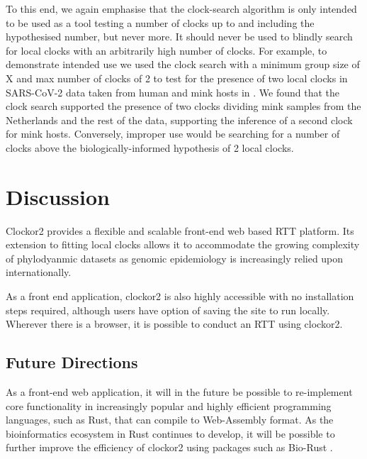\documentclass{article}
\begin{document}
To this end, we again emphasise that the clock-search algorithm is only intended to be used as a tool testing a number of clocks up to and including the hypothesised number, but never more. It should never be used to blindly search for local clocks with an arbitrarily high number of clocks. For example, to demonstrate intended use we used the clock search with a minimum group size of X and max number of clocks of 2 to test for the presence of two local clocks in SARS-CoV-2 data taken from human and mink hosts in \citet{porter2023evolutionary}. We found that the clock search supported the presence of two clocks dividing mink samples from the Netherlands and the rest of the data, supporting the inference of a second clock for mink hosts. Conversely, improper use would be searching for a number of clocks above the biologically-informed hypothesis of 2 local clocks.

\section*{Discussion}
Clockor2 provides a flexible and scalable front-end web based RTT platform. Its extension to fitting local clocks allows it to accommodate the growing complexity of phylodyanmic datasets as genomic epidemiology is increasingly relied upon internationally. 

As a front end application, clockor2 is also highly accessible with no installation steps required, although users have option of saving the site to run locally. Wherever there is a browser, it is possible to conduct an RTT using clockor2. 

\subsection*{Future Directions}
As a front-end web application, it will in the future be possible to re-implement core functionality in increasingly popular and highly efficient programming languages, such as Rust, that can compile to Web-Assembly format. As the bioinformatics ecosystem in Rust continues to develop, it will be possible to further improve the efficiency of clockor2 using packages such as Bio-Rust \citep{koester_rust-bio-2015}.

\end{document}
